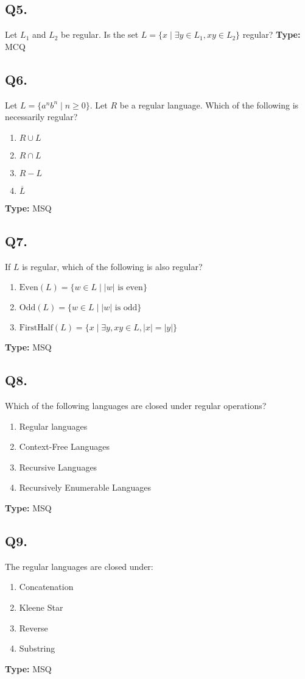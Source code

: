 \subsection*{Q5.}
Let $L_1$ and $L_2$ be regular. Is the set $L = \{ x \mid \exists y \in L_1, xy \in L_2 \}$ regular?
\textbf{Type:} MCQ

\subsection*{Q6.}
Let $L = \{ a^n b^n \mid n \geq 0 \}$. Let $R$ be a regular language. Which of the following is necessarily regular?
\begin{enumerate}[label=(\alph*)]
    \item $R \cup L$
    \item $R \cap L$
    \item $R - L$
    \item $\overline{L}$
\end{enumerate}
\textbf{Type:} MSQ

\subsection*{Q7.}
If $L$ is regular, which of the following is also regular?
\begin{enumerate}[label=(\alph*)]
    \item $\text{Even}(L) = \{ w \in L \mid |w| \text{ is even} \}$
    \item $\text{Odd}(L) = \{ w \in L \mid |w| \text{ is odd} \}$
    \item $\text{FirstHalf}(L) = \{ x \mid \exists y, xy \in L, |x| = |y| \}$
\end{enumerate}
\textbf{Type:} MSQ

\subsection*{Q8.}
Which of the following languages are closed under regular operations?
\begin{enumerate}[label=(\alph*)]
    \item Regular languages
    \item Context-Free Languages
    \item Recursive Languages
    \item Recursively Enumerable Languages
\end{enumerate}
\textbf{Type:} MSQ

\subsection*{Q9.}
The regular languages are closed under:
\begin{enumerate}[label=(\alph*)]
    \item Concatenation
    \item Kleene Star
    \item Reverse
    \item Substring
\end{enumerate}
\textbf{Type:} MSQ

